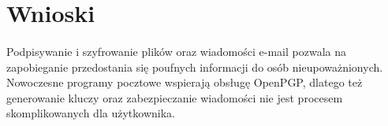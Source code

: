 \documentclass[wide,a4paper,titlepage,12pt] {article}
\begin{document}
  \section{Wnioski}
  \paragraph{}
  Podpisywanie i szyfrowanie plików oraz wiadomości e-mail pozwala na zapobieganie przedostania się poufnych informacji do osób nieupoważnionych. Nowoczesne programy pocztowe wspierają obsługę OpenPGP, dlatego też generowanie kluczy oraz zabezpieczanie wiadomości nie jest procesem skomplikowanych dla użytkownika.
\end{document}

